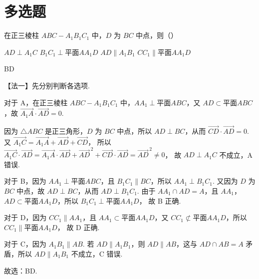 \documentclass[UTF8,a4paper,oneside,11pt]{ctexbook}
\begin{document}
\section{多选题}

\begin{problem}
在正三棱柱 \(ABC - A_1B_1C_1\) 中，\(D\) 为 \(BC\) 中点，则（\quad）

\choices
    {\(AD \perp A_1C\)}
    {\(B_1C_1 \perp \text{平面} AA_1D\)}
    {\(AD \parallel A_1B_1\)}
    {\(CC_1 \parallel \text{平面} AA_1D\)}
\end{problem}

\begin{answer}
BD
\end{answer}

\begin{solution}
【法一】先分别判断各选项.

对于 A，在正三棱柱 \(ABC - A_1B_1C_1\) 中，\(AA_1 \perp \text{平面} ABC\)，又 \(AD \subset \text{平面} ABC\)，故
\(\overrightarrow{A_1A} \cdot \overrightarrow{AD} = 0\).


因为 \(\triangle ABC\) 是正三角形，\(D\) 为 \(BC\) 中点，所以 \(AD \perp BC\)，从而
\(\overrightarrow{CD} \cdot \overrightarrow{AD} = 0\).
又
\(\overrightarrow{A_1C} = \overrightarrow{A_1A} + \overrightarrow{AD} + \overrightarrow{CD}\)，
所以
\(
\overrightarrow{A_1C} \cdot \overrightarrow{AD}
= \overrightarrow{A_1A} \cdot \overrightarrow{AD} + \overrightarrow{AD}^{\,2} + \overrightarrow{CD} \cdot \overrightarrow{AD}
= \overrightarrow{AD}^{\,2} \neq 0
\)，
故 \(AD \perp A_1C\) 不成立，A 错误.

对于 B，因为 \(AA_1 \perp \text{平面} ABC\)，且 \(B_1C_1 \parallel BC\)，所以 \(AA_1 \perp B_1C_1\).
又因为 \(D\) 为 \(BC\) 中点，故 \(AD \perp BC\)，从而 \(AD \perp B_1C_1\).
由于 \(AA_1 \cap AD = A\)，且 \(AA_1\)，\(AD \subset \text{平面} AA_1D\)，所以
\(B_1C_1 \perp \text{平面} AA_1D\)，
故 B 正确.

对于 D，因为 \(CC_1 \parallel AA_1\)，且 \(AA_1 \subset \text{平面} AA_1D\)，又 \(CC_1 \not\subset \text{平面} AA_1D\)，所以
\(CC_1 \parallel \text{平面} AA_1D\)，
故 D 正确.

对于 C，因为 \(A_1B_1 \parallel AB\). 若 \(AD \parallel A_1B_1\)，则 \(AD \parallel AB\)，这与 \(AD \cap AB = A\) 矛盾，所以 \(AD \parallel A_1B_1\) 不成立，C 错误.

故选：BD.


\end{solution}
\end{document}
